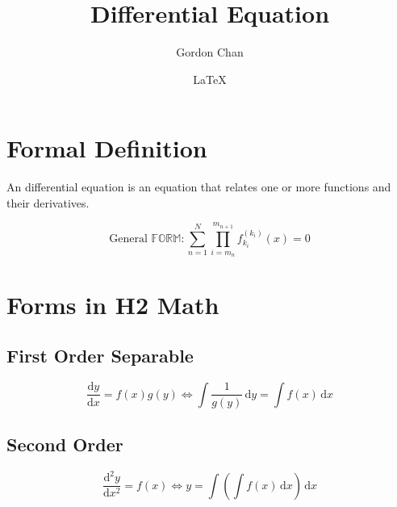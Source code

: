 \documentclass[a4paper]{article}
\author{Gordon Chan}
\title{Differential Equation}
\date{\LaTeX}
\newcommand{\dd}{\mathrm{d}}
\begin{document}
\maketitle
\section{Formal Definition}

An differential equation is an equation that relates one or more functions and their derivatives.

\[\text{General }\mathbb{FORM}:\sum\limits_{n=1}^N\prod\limits_{i=m_n}^{m_{n+1}}f_{k_i}^{(k_i)}(x)=0\]

\section{Forms in H2 Math}
\subsection{First Order Separable}

\[\frac{\dd y}{\dd x}=f(x)g(y)\iff\int\frac1{g(y)}\,\dd y=\int f(x)\,\dd x\]


\subsection{Second Order}

\[\frac{\dd^2 y}{\dd x^2}=f(x)\iff y=\int\left(\int f(x)\,\dd x\right)\,\dd x\]
\end{document}
